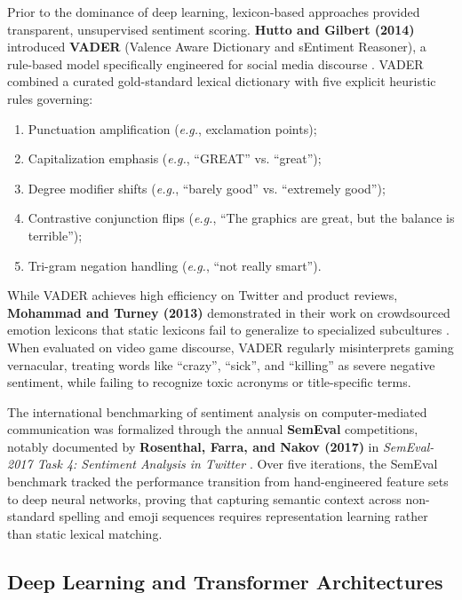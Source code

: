 Prior to the dominance of deep learning, lexicon-based approaches provided transparent, unsupervised sentiment scoring. \textbf{Hutto and Gilbert (2014)} introduced \textbf{VADER} (Valence Aware Dictionary and sEntiment Reasoner), a rule-based model specifically engineered for social media discourse \cite{hutto2014vader}. VADER combined a curated gold-standard lexical dictionary with five explicit heuristic rules governing:
\begin{enumerate}
    \item Punctuation amplification (\textit{e.g.}, exclamation points);
    \item Capitalization emphasis (\textit{e.g.}, ``GREAT'' vs. ``great'');
    \item Degree modifier shifts (\textit{e.g.}, ``barely good'' vs. ``extremely good'');
    \item Contrastive conjunction flips (\textit{e.g.}, ``The graphics are great, but the balance is terrible'');
    \item Tri-gram negation handling (\textit{e.g.}, ``not really smart'').
\end{enumerate}
While VADER achieves high efficiency on Twitter and product reviews, \textbf{Mohammad and Turney (2013)} demonstrated in their work on crowdsourced emotion lexicons that static lexicons fail to generalize to specialized subcultures \cite{mohammad2013crowdsourcing}. When evaluated on video game discourse, VADER regularly misinterprets gaming vernacular, treating words like ``crazy'', ``sick'', and ``killing'' as severe negative sentiment, while failing to recognize toxic acronyms or title-specific terms.

The international benchmarking of sentiment analysis on computer-mediated communication was formalized through the annual \textbf{SemEval} competitions, notably documented by \textbf{Rosenthal, Farra, and Nakov (2017)} in \textit{SemEval-2017 Task 4: Sentiment Analysis in Twitter} \cite{rosenthal2017semeval}. Over five iterations, the SemEval benchmark tracked the performance transition from hand-engineered feature sets to deep neural networks, proving that capturing semantic context across non-standard spelling and emoji sequences requires representation learning rather than static lexical matching.

\subsection{Deep Learning and Transformer Architectures}

